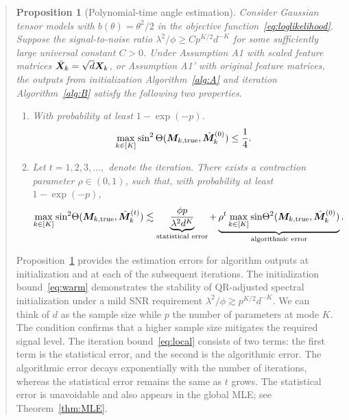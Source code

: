 \documentclass[11pt]{article}
\theoremstyle{plain}
\newtheorem{prop}{Proposition}
\theoremstyle{definition}
\newcommand*{\KeepStyleUnderBrace}[1]{%
  \mathop{%
    \mathchoice
    {\underbrace{\displaystyle#1}}%
    {\underbrace{\textstyle#1}}%
    {\underbrace{\scriptstyle#1}}%
    {\underbrace{\scriptscriptstyle#1}}%
  }\limits
}
\begin{document}
\begin{enumerate}[wide, labelwidth=!, labelindent=0pt]
\begin{quote}
\begin{prop}[Polynomial-time angle estimation]\label{lem:ini} Consider Gaussian tensor models with $b(\theta)=\theta^2/2$ in the objective function~\eqref{eq:loglikelihood}. Suppose the signal-to-noise ratio $\lambda^2/\phi \geq C p^{K/2}d^{-K}$ for some sufficiently large universal constant $C>0$. 
Under Assumption A1 with scaled feature matrices $\bar {\bm X}_k=\sqrt{d}\bm X_k$, or Assumption A1' with original feature matrices, the outputs from initialization Algorithm~\ref{alg:A} and iteration Algorithm~\ref{alg:B} satisfy the following two properties.
\begin{enumerate}[label=(\alph*)]
\item With probability at least $1-\exp(-p)$. 
\begin{equation}\label{eq:warm}
\max_{k\in[K]}\sin^2\Theta(\bm M_{k,\textup{true}},\hat {\bm M}_k^{(0)})\leq {1\over 4}. 
\end{equation}
\item Let $t=1,2,3,\ldots,$ denote the iteration. There exists a contraction parameter $\rho\in(0,1)$, such that, with probability at least $1-\exp(-p)$, 
\begin{equation}\label{eq:local}
\max_{k\in[K]}\textup{sin}^2 \Theta(\trueM, \hat \mM^{(t)}_k) \lesssim \KeepStyleUnderBrace{{\phi p \over \lambda^2 d^K}}_{\text{statistical error}}+\KeepStyleUnderBrace{\rho^{t}\max_{k\in[K]}\textup{sin} \Theta^2(\trueM, \hat \mM_k^{(0)})}_{\text{algorithmic error}}.
\end{equation}
\end{enumerate}
\end{prop}

Proposition~\ref{lem:ini} provides the estimation errors for algorithm outputs at initialization and at each of the subsequent iterations. The initialization bound~\eqref{eq:warm} demonstrates the stability of QR-adjusted spectral initialization under a mild SNR requirement $\lambda^2/\phi \gtrsim p^{K/2}d^{-K}$. We can think of $d$ as the sample size while $p$ the number of parameters at mode $K$. The condition confirms that a higher sample size mitigates the required signal level. The iteration bound~\eqref{eq:local} consists of two terms: the first term is the statistical error, and the second is the algorithmic error. The algorithmic error decays exponentially with the number of iterations, whereas the statistical error remains the same as $t$ grows. The statistical error is unavoidable and also appears in the global MLE; see Theorem~\ref{thm:MLE}.


\end{quote}
\end{enumerate}
\end{document}
